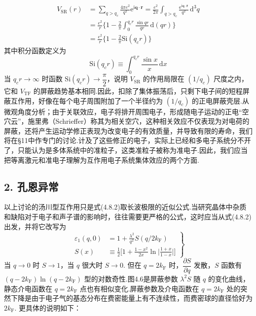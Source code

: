 \begin{equation}
\begin{aligned}
  V_{\mathrm{SR}}(r)&=\sum_{q>q_{c}}\frac{4\pi e^{2}}{q^{2}}
  \mathrm{e}^{\mathrm{i}\boldsymbol{q}\cdot\boldsymbol{r}}
  =\frac{e^{2}}{2\pi}\int_{q>q_{c}}\frac{\mathrm{e}^{\mathrm{i}\boldsymbol{q}\cdot\boldsymbol{r}}}{q^{2}}\,\mathrm{d}^{3}q\\
  &=\frac{e^{2}}{r}\bigg\{1-\frac{2}{\pi}\int_{0}^{q_{c}r}
  \frac{\sin qr}{qr}\,\mathrm{d}(qr)\bigg\}\\
  &=\frac{e^{2}}{r}\bigg\{1-\frac{2}{\pi}\mathrm{Si}\left(q_{c}r\right)\bigg\}
\end{aligned}
\end{equation}
其中积分函数定义为
\begin{equation}
  \mathrm{Si}\left(q_{c}r\right)\equiv\int_{0}^{q_{c}r}\frac{\sin x}{x}\,\mathrm{d}x
\end{equation}
当 $q_{c}r\to\infty$ 时函数 $\mathrm{Si}(q_{c}r)\to\dfrac{\pi}{2}$，说明 $V_{\mathrm{SR}}$ 的作用局限在 $\left(1/q_{c}\right)$ 尺度之内，它和 $V_{\mathrm{TF}}$ 的屏蔽趋势基本相同.因此，扣除了集体振荡后，只剩下电子间的短程屏蔽互作用，好像在每个电子周围附加了一个半径约为 $\left(1/q_{c}\right)$ 的正电屏蔽壳层.从微观角度分析；由于关联效应，电子将排开周围电子，形成随电子运动的正电“空穴云”，施里弗（Schrieffer）称其为相关空穴，这种相关效应不仅表现为对电荷的屏蔽，还将产生运动学修正表现为改变电子的有效质量，并导致有限的寿命，我们将在§11中作专门的讨论.计及了这些修正的电子，实际上已经和多电子系统分不开了，只能认为是多体系统中的准粒子，这类准粒子被称为准电子.因此，我们应当把等离激元和准电子理解为互作用电子系统集体效应的两个方面.

\subsection*{2. 孔恩异常}

以上讨论的汤川型互作用只是式(4.8.2)取长波极限的近似公式.当研究晶体中杂质和缺陷对于电子和声子谱的影响时，往往需要更严格的公式，这时应当从式(4.8.2)出发，并将它改写为
\begin{equation}
  \left.\begin{aligned}
  \varepsilon_{1}(q,0)&=1+\frac{\lambda^{2}}{q^{2}}S\left(q/2k_{\mathrm{F}}\right)\\
  S(x)&\equiv\frac{1}{2}\bigg[1+\frac{1-x^{2}}{2x}
  \ln\bigg|\frac{1+x}{1-x}\bigg|\bigg]
  \end{aligned}\right\}
\end{equation}
当 $q\to 0$ 时 $S\to 1$，当 $q$ 很大时 $S\to 0$. 但在 $q=2k_{\mathrm{F}}$ 时，$\dfrac{\partial S}{\partial q}$ 发散，$S$ 函数有 $(q-2k_{\mathrm{F}})\ln\left(q-2k_{\mathrm{F}}\right)$ 型的对数奇性.图4.6是屏蔽参数 $\lambda^{2}S$ 随 $q$ 的变化曲线，静态介电函数在 $q=2k_{\mathrm{F}}$ 点也有相似变化.屏蔽参数及介电函数在 $q=2k_{\mathrm{F}}$ 处的突然下降是由于电子气的基态分布在费密能量上有不连续性，而费密球的直径恰好为 $2k_{\mathrm{F}}$. 更具体的说明如下：

